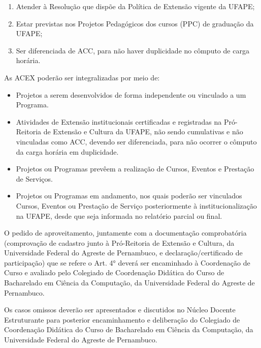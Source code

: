\documentclass[
	12pt,				%
	openright,			%
  oneside,     %
	a4paper,			%
	english,			%
	french,				%
	spanish,			%
	brazil				%
	]{abntex2}
\begin{document}
\begin{enumerate}[label=\Roman*.]
   \item Atender à Resolução que dispõe da Política de Extensão vigente da UFAPE;
   \item Estar previstas nos Projetos Pedagógicos dos cursos (PPC) de graduação da UFAPE;
   \item Ser diferenciada de ACC, para não haver duplicidade no cômputo de carga horária.
\end{enumerate}
  
As ACEX poderão ser integralizadas por meio de:

\begin{itemize}
   \item Projetos a serem desenvolvidos de forma independente ou vinculado a um Programa.
   \item Atividades de Extensão institucionais certificadas e registradas na Pró-Reitoria de Extensão e Cultura da UFAPE, não sendo cumulativas e não vinculadas como ACC, devendo ser diferenciada, para não ocorrer o cômputo da carga horária em duplicidade.
   \item Projetos ou Programas prevêem a realização de Cursos, Eventos e Prestação de Serviços.
   \item Projetos ou Programas em andamento, nos quais poderão ser vinculados Cursos, Eventos ou Prestação de Serviço posteriormente à institucionalização na UFAPE, desde que seja informada no relatório parcial ou final.
\end{itemize}

O pedido de aproveitamento, juntamente com a documentação comprobatória (comprovação de cadastro junto à Pró-Reitoria de Extensão e Cultura, da Universidade Federal do Agreste de Pernambuco, e declaração/certificado de participação) que se refere o Art. 4° deverá ser encaminhado à Coordenação de Curso e avaliado pelo Colegiado de Coordenação Didática do Curso de Bacharelado em Ciência da Computação, da Universidade Federal do Agreste de Pernambuco.

Os casos omissos deverão ser apresentados e discutidos no Núcleo Docente Estruturante para posterior encaminhamento e deliberação do Colegiado de Coordenação Didática do Curso de Bacharelado em Ciência da Computação, da Universidade Federal do Agreste de Pernambuco.



%
%
\end{document}
